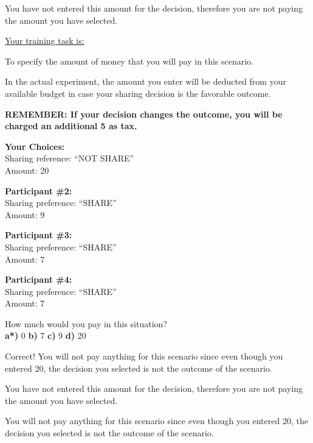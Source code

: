 You have not entered this amount for the decision, therefore you are not paying the amount you have selected.



\underline{Your training task is:}  

To specify the amount of money that you will pay in this scenario. 

In the actual experiment, the amount you enter will be deducted from your available budget in case your sharing decision is the favorable outcome.

\textbf{REMEMBER:  If your decision changes the outcome, you will be charged an additional 5 as tax.}
\clearpage

\textbf{Your Choices:} \\
\indent \indent Sharing reference: 	``NOT SHARE'' \\
\indent \indent Amount:		20 

\textbf{Participant \#2:} \\ 
\indent \indent Sharing preference:	``SHARE'' \\
\indent \indent Amount: 		9

\textbf{Participant \#3:} \\
\indent \indent Sharing preference:	``SHARE'' \\
\indent \indent Amount: 		7

\textbf{Participant \#4:} \\
\indent \indent Sharing preference:	``SHARE'' \\
\indent \indent Amount: 		7  

How much would you pay in this situation? \\
\indent \textbf{a*)} 0 \indent \indent \textbf{b)} 7
\indent \indent \textbf{c)} 9
\indent \indent \textbf{d)} 20

 Correct! You will not pay anything for this scenario since even though you entered 20, the decision you selected is not the outcome of the scenario. 

 You have not entered this amount for the decision, therefore you are not paying the amount you have selected.

 You will not pay anything for this scenario since even though you entered 20, the decision you selected is not the outcome of the scenario.



